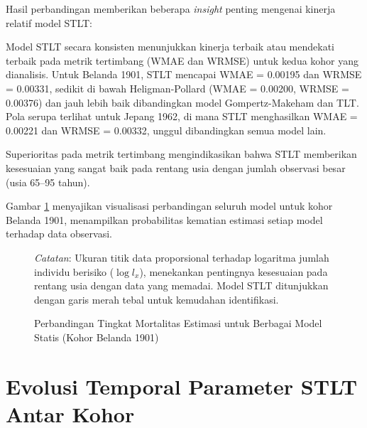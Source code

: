 Hasil perbandingan memberikan beberapa \textit{insight} penting mengenai kinerja relatif model STLT:

Model STLT secara konsisten menunjukkan kinerja terbaik atau mendekati terbaik pada metrik tertimbang (WMAE dan WRMSE) untuk kedua kohor yang dianalisis. Untuk Belanda 1901, STLT mencapai WMAE = 0.00195 dan WRMSE = 0.00331, sedikit di bawah Heligman-Pollard (WMAE = 0.00200, WRMSE = 0.00376) dan jauh lebih baik dibandingkan model Gompertz-Makeham dan TLT. Pola serupa terlihat untuk Jepang 1962, di mana STLT menghasilkan WMAE = 0.00221 dan WRMSE = 0.00332, unggul dibandingkan semua model lain.

Superioritas pada metrik tertimbang mengindikasikan bahwa STLT memberikan kesesuaian yang sangat baik pada rentang usia dengan jumlah observasi besar (usia 65--95 tahun).

Gambar \ref{fig:model_comparison_visualization} menyajikan visualisasi perbandingan seluruh model untuk kohor Belanda 1901, menampilkan probabilitas kematian estimasi setiap model terhadap data observasi.

\begin{figure}[htbp]
\centering
\caption{Perbandingan Tingkat Mortalitas Estimasi untuk Berbagai Model Statis (Kohor Belanda 1901)}
\label{fig:model_comparison_visualization}
\begin{fignotes}
\small
\item \textit{Catatan}: Ukuran titik data proporsional terhadap logaritma jumlah individu berisiko ($\log l_x$), menekankan pentingnya kesesuaian pada rentang usia dengan data yang memadai. Model STLT ditunjukkan dengan garis merah tebal untuk kemudahan identifikasi.
\end{fignotes}
\end{figure}


\section{Evolusi Temporal Parameter STLT Antar Kohor}

